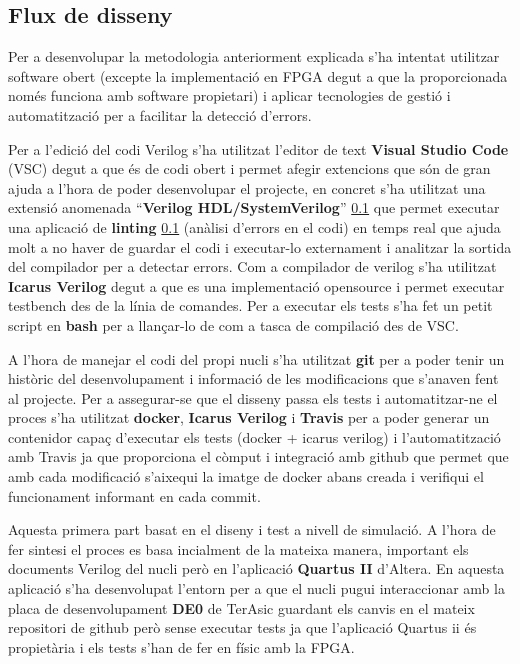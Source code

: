 \documentclass[10pt,a4paper,twocolumn,twoside]{article}
\begin{document}
\subsection{Flux de disseny}  %
Per a desenvolupar la metodologia anteriorment explicada s'ha intentat utilitzar software obert (excepte la implementació en FPGA degut a que la proporcionada només funciona amb software propietari) i aplicar tecnologies de gestió i automatització per a facilitar la detecció d'errors. 

Per a l'edició del codi Verilog s'ha utilitzat l'editor de text \textbf{Visual Studio Code} (VSC) degut a que és de codi obert i permet afegir extencions que són de gran ajuda a l'hora de poder desenvolupar el projecte, en concret s'ha utilitzat una extensió anomenada ``\textbf{Verilog HDL/SystemVerilog}'' \ref{} que permet executar una aplicació de \textbf{linting} \ref{} (anàlisi d'errors en el codi) en temps real que ajuda molt a no haver de guardar el codi i executar-lo externament i analitzar la sortida del compilador per a detectar errors. Com a compilador de verilog s'ha utilitzat \textbf{Icarus Verilog} degut a que es una implementació opensource i permet executar testbench des de la línia de comandes. Per a executar els tests s'ha fet un petit script en \textbf{bash} per a llançar-lo de com a tasca de compilació des de VSC. 

A l'hora de manejar el codi del propi nucli s'ha utilitzat \textbf{git} per a poder tenir un històric del desenvolupament i informació de les modificacions que s'anaven fent al projecte. Per a assegurar-se que el disseny passa els tests i automatitzar-ne el proces s'ha utilitzat \textbf{docker}, \textbf{Icarus Verilog} i \textbf{Travis} per a poder generar un contenidor capaç d'executar els tests (docker + icarus verilog) i l'automatització amb Travis ja que proporciona el còmput i integració amb github que permet que amb cada modificació s'aixequi la imatge de docker abans creada i verifiqui el funcionament informant en cada commit. 

Aquesta primera part basat en el diseny i test a nivell de simulació. A l'hora de fer sintesi el proces es basa incialment de la mateixa manera, important els documents Verilog del nucli però en l'aplicació \textbf{Quartus II} d'Altera. En aquesta aplicació s'ha desenvolupat l'entorn per a que el nucli pugui interaccionar amb la placa de desenvolupament \textbf{DE0} de TerAsic guardant els canvis en el mateix repositori de github però sense executar tests ja que l'aplicació Quartus ii és propietària i els tests s'han de fer en físic amb la FPGA.
\end{document}
